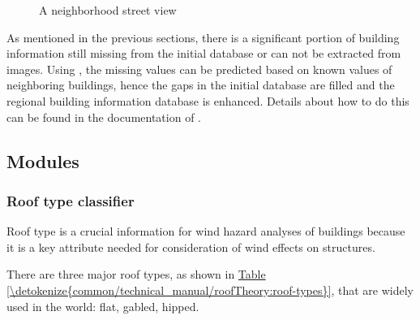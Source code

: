 \documentclass[letterpaper,10pt,english]{sphinxmanual}
\begin{document}
\begin{figure}[htbp]
\centering
\capstart

\noindent{}
\caption{A neighborhood street view}\label{\detokenize{common/technical_manual/framework:id17}}\label{\detokenize{common/technical_manual/framework:neighborhood}}\end{figure}

\sphinxAtStartPar
As mentioned in the previous sections,
there is a significant portion of building information still missing from the
initial database or can not be extracted from images.
Using ,
the missing values can be predicted based on known values of neighboring buildings,
hence the gaps in the initial database are filled and the regional building information database is enhanced.
Details about how to do this can be found in the documentation of .

\sphinxAtStartPar



\subsection{Modules}
\label{\detokenize{common/technical_manual/modulesTheory:modules}}\label{\detokenize{common/technical_manual/modulesTheory:modulestheory}}\label{\detokenize{common/technical_manual/modulesTheory::doc}}

\subsubsection{Roof type classifier}
\label{\detokenize{common/technical_manual/roofTheory:roof-type-classifier}}\label{\detokenize{common/technical_manual/roofTheory:rooftheory}}\label{\detokenize{common/technical_manual/roofTheory::doc}}
\sphinxAtStartPar
Roof type is a crucial information for wind hazard analyses of buildings because it is
a key attribute needed for consideration of wind effects on structures.

\sphinxAtStartPar
There are three major roof types, as shown in \hyperref[\detokenize{common/technical_manual/roofTheory:roof-types}]{Table \ref{\detokenize{common/technical_manual/roofTheory:roof-types}}}, that are widely used in the world: flat, gabled, hipped.
\end{document}
